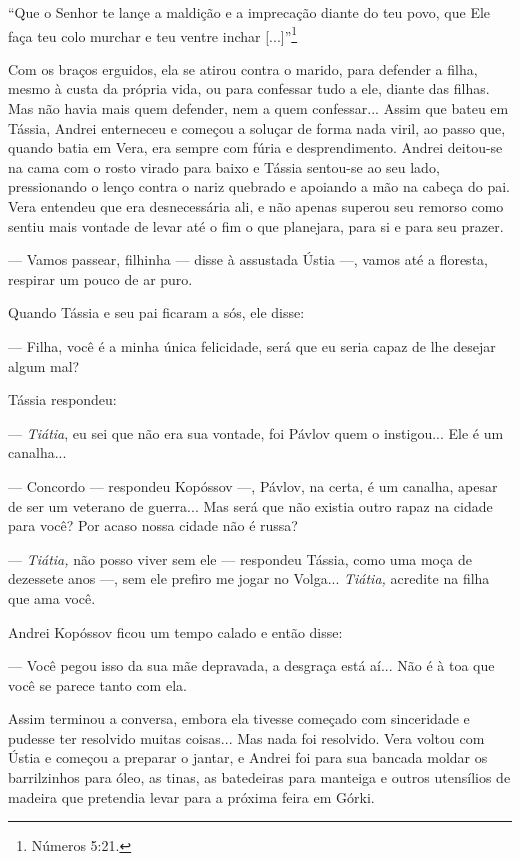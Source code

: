 ``Que o Senhor te lançe a maldição e a imprecação diante do teu povo,
que Ele faça teu colo murchar e teu ventre inchar {[}...{]}''\footnote{Números
  5:21.}

Com os braços erguidos, ela se atirou contra o marido, para defender a
filha, mesmo à custa da própria vida, ou para confessar tudo a ele,
diante das filhas. Mas não havia mais quem defender, nem a quem
confessar... Assim que bateu em Tássia, Andrei enterneceu e começou a
soluçar de forma nada viril, ao passo que, quando batia em Vera, era
sempre com fúria e desprendimento. Andrei deitou-se na cama com o rosto
virado para baixo e Tássia sentou-se ao seu lado, pressionando o lenço
contra o nariz quebrado e apoiando a mão na cabeça do pai. Vera entendeu
que era desnecessária ali, e não apenas superou seu remorso como sentiu
mais vontade de levar até o fim o que planejara, para si e para seu
prazer.

--- Vamos passear, filhinha --- disse à assustada Ústia ---, vamos até a
floresta, respirar um pouco de ar puro.

Quando Tássia e seu pai ficaram a sós, ele disse:

--- Filha, você é a minha única felicidade, será que eu seria capaz de
lhe desejar algum mal?

Tássia respondeu:

--- \emph{Tiátia}, eu sei que não era sua vontade, foi Pávlov quem o
instigou... Ele é um canalha...

--- Concordo --- respondeu Kopóssov ---, Pávlov, na certa, é um canalha,
apesar de ser um veterano de guerra... Mas será que não existia outro
rapaz na cidade para você? Por acaso nossa cidade não é russa?

--- \emph{Tiátia,} não posso viver sem ele --- respondeu Tássia, como
uma moça de dezessete anos ---, sem ele prefiro me jogar no Volga...
\emph{Tiátia,} acredite na filha que ama você.

Andrei Kopóssov ficou um tempo calado e então disse:

--- Você pegou isso da sua mãe depravada, a desgraça está aí... Não é à
toa que você se parece tanto com ela.

Assim terminou a conversa, embora ela tivesse começado com sinceridade e
pudesse ter resolvido muitas coisas... Mas nada foi resolvido. Vera
voltou com Ústia e começou a preparar o jantar, e Andrei foi para sua
bancada moldar os barrilzinhos para óleo, as tinas, as batedeiras para
manteiga e outros utensílios de madeira que pretendia levar para a
próxima feira em Górki.

